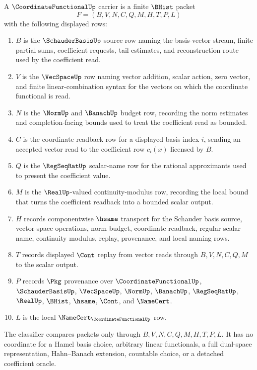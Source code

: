 \begin{definition}
\label{def:coordinate-functional-carrier}
A $\CoordinateFunctionalUp$ carrier is a finite $\BHist$ packet
$$
F=(B,V,N,C,Q,M,H,T,P,L)
$$
with the following displayed rows:
\begin{enumerate}
\item $B$ is the $\SchauderBasisUp$ source row naming the basis-vector stream, finite partial sums, coefficient requests, tail estimates, and reconstruction route used by the coefficient read.
\item $V$ is the $\VecSpaceUp$ row naming vector addition, scalar action, zero vector, and finite linear-combination syntax for the vectors on which the coordinate functional is read.
\item $N$ is the $\NormUp$ and $\BanachUp$ budget row, recording the norm estimates and completion-facing bounds used to treat the coefficient read as bounded.
\item $C$ is the coordinate-readback row for a displayed basis index $i$, sending an accepted vector read to the coefficient row $c_i(x)$ licensed by $B$.
\item $Q$ is the $\RegSeqRatUp$ scalar-name row for the rational approximants used to present the coefficient value.
\item $M$ is the $\RealUp$-valued continuity-modulus row, recording the local bound that turns the coefficient readback into a bounded scalar output.
\item $H$ records componentwise $\hsame$ transport for the Schauder basis source, vector-space operations, norm budget, coordinate readback, regular scalar name, continuity modulus, replay, provenance, and local naming rows.
\item $T$ records displayed $\Cont$ replay from vector reads through $B,V,N,C,Q,M$ to the scalar output.
\item $P$ records $\Pkg$ provenance over $\CoordinateFunctionalUp$, $\SchauderBasisUp$, $\VecSpaceUp$, $\NormUp$, $\BanachUp$, $\RegSeqRatUp$, $\RealUp$, $\BHist$, $\hsame$, $\Cont$, and $\NameCert$.
\item $L$ is the local $\NameCert_{\CoordinateFunctionalUp}$ row.
\end{enumerate}
The classifier compares packets only through $B,V,N,C,Q,M,H,T,P,L$. It has no coordinate for a Hamel basis choice, arbitrary linear functionals, a full dual-space representation, Hahn--Banach extension, countable choice, or a detached coefficient oracle.
\end{definition}


